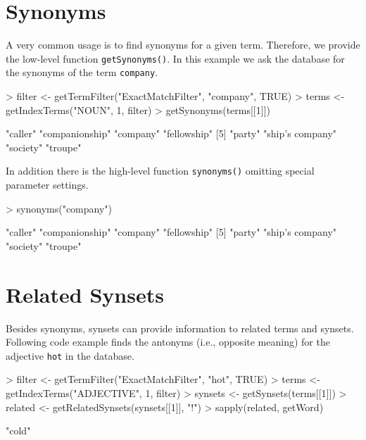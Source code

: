 \documentclass[a4paper]{article}
\newcommand{\code}[1]{\mbox{\texttt{#1}}}
\begin{document}
\section*{Synonyms}
A very common usage is to find synonyms for a given term. Therefore,
we provide the low-level function \code{getSynonyms()}. In this example
we ask the database for the synonyms of the term \code{company}.
\begin{Schunk}
\begin{Sinput}
> filter <- getTermFilter("ExactMatchFilter", "company", TRUE)
> terms <- getIndexTerms("NOUN", 1, filter)
> getSynonyms(terms[[1]])
\end{Sinput}
\begin{Soutput}
[1] "caller"         "companionship"  "company"        "fellowship"    
[5] "party"          "ship's company" "society"        "troupe"        
\end{Soutput}
\end{Schunk}
In addition there is the high-level function \code{synonyms()}
omitting special parameter settings.
\begin{Schunk}
\begin{Sinput}
> synonyms("company")
\end{Sinput}
\begin{Soutput}
[1] "caller"         "companionship"  "company"        "fellowship"    
[5] "party"          "ship's company" "society"        "troupe"        
\end{Soutput}
\end{Schunk}

\section*{Related Synsets}
Besides synonyms, synsets can provide information to related terms and
synsets. Following code example finds the antonyms (i.e., opposite
meaning) for the adjective \code{hot} in the database.
\begin{Schunk}
\begin{Sinput}
> filter <- getTermFilter("ExactMatchFilter", "hot", TRUE)
> terms <- getIndexTerms("ADJECTIVE", 1, filter)
> synsets <- getSynsets(terms[[1]])
> related <- getRelatedSynsets(synsets[[1]], "!")
> sapply(related, getWord)
\end{Sinput}
\begin{Soutput}
[1] "cold"
\end{Soutput}
\end{Schunk}
\end{document}
